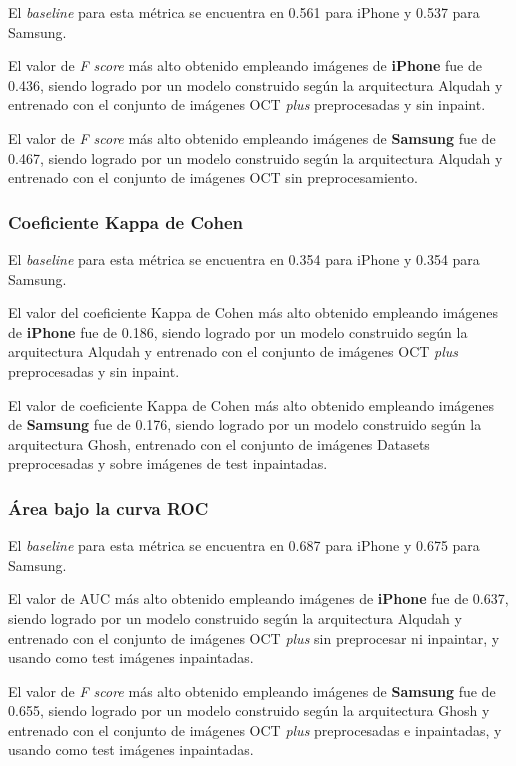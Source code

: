 El \textit{baseline} para esta métrica se encuentra en 0.561 para iPhone y 0.537 para Samsung.

El valor de \textit{F score} más alto obtenido empleando imágenes de \textbf{iPhone} fue de 0.436, siendo logrado por un modelo construido según la arquitectura Alqudah y entrenado con el conjunto de imágenes OCT \textit{plus} preprocesadas y sin inpaint.

El valor de \textit{F score} más alto obtenido empleando imágenes de \textbf{Samsung} fue de 0.467, siendo logrado por un modelo construido según la arquitectura Alqudah y entrenado con el conjunto de imágenes OCT sin preprocesamiento.

\subsubsection{Coeficiente Kappa de Cohen}

El \textit{baseline} para esta métrica se encuentra en 0.354 para iPhone y 0.354 para Samsung.

El valor del coeficiente Kappa de Cohen más alto obtenido empleando imágenes de \textbf{iPhone} fue de 0.186, siendo logrado por un modelo construido según la arquitectura Alqudah y entrenado con el conjunto de imágenes OCT \textit{plus} preprocesadas y sin inpaint.

El valor de coeficiente Kappa de Cohen más alto obtenido empleando imágenes de \textbf{Samsung} fue de 0.176, siendo logrado por un modelo construido según la arquitectura Ghosh, entrenado con el conjunto de imágenes Datasets preprocesadas y sobre imágenes de test inpaintadas.

\subsubsection{Área bajo la curva ROC}

El \textit{baseline} para esta métrica se encuentra en 0.687 para iPhone y 0.675 para Samsung.

El valor de AUC más alto obtenido empleando imágenes de \textbf{iPhone} fue de 0.637, siendo logrado por un modelo construido según la arquitectura Alqudah y entrenado con el conjunto de imágenes OCT \textit{plus} sin preprocesar ni inpaintar, y usando como test imágenes inpaintadas.

El valor de \textit{F score} más alto obtenido empleando imágenes de \textbf{Samsung} fue de 0.655, siendo logrado por un modelo construido según la arquitectura Ghosh y entrenado con el conjunto de imágenes OCT \textit{plus} preprocesadas e inpaintadas, y usando como test imágenes inpaintadas.

